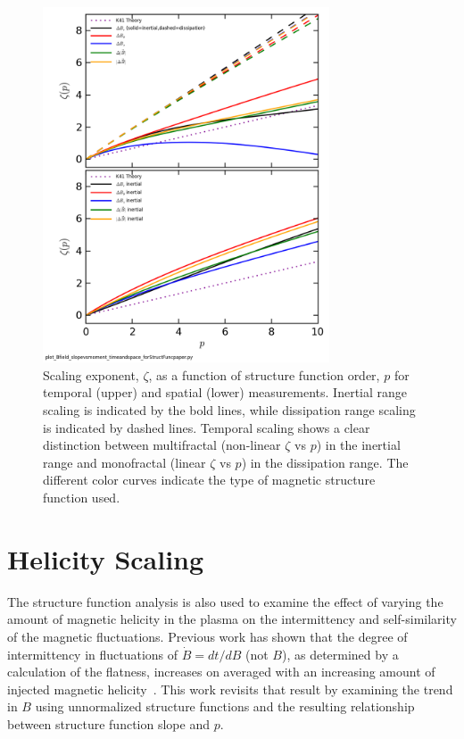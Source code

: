 \documentclass[aps,prl,amsmath,amssymb,reprint,superscriptaddress]{revtex4-1} %
\begin{document}
\begin{figure}[!htbp]
\centerline{
\includegraphics[width=8.5cm]{Bfield_StructureFunctionSlope_vs_Moment_timeandspace_100313Shots41to80_forStructFuncpaper.png}}
\caption{\label{fig:slopevsmom} Scaling exponent, $\zeta$, as a function of structure function order, $p$ for temporal (upper) and spatial (lower) measurements. Inertial range scaling is indicated by the bold lines, while dissipation range scaling is indicated by dashed lines. Temporal scaling shows a clear distinction between multifractal (non-linear $\zeta$ vs $p$) in the inertial range and monofractal (linear $\zeta$ vs $p$) in the dissipation range. The different color curves indicate the type of magnetic structure function used. }
\end{figure}

\section{Helicity Scaling}

The structure function analysis is also used to examine the effect of varying the amount of magnetic helicity in the plasma on the intermittency and self-similarity of the magnetic fluctuations. Previous work has shown that the degree of intermittency in fluctuations of $\dot{B}=dt/dB$ (not $B$), as determined by a calculation of the flatness, increases on averaged with an increasing amount of injected magnetic helicity~\cite{schaffner2014b}. This work revisits that result by examining the trend in $B$ using unnormalized structure functions and the resulting relationship between structure function slope and $p$. 
\end{document}
